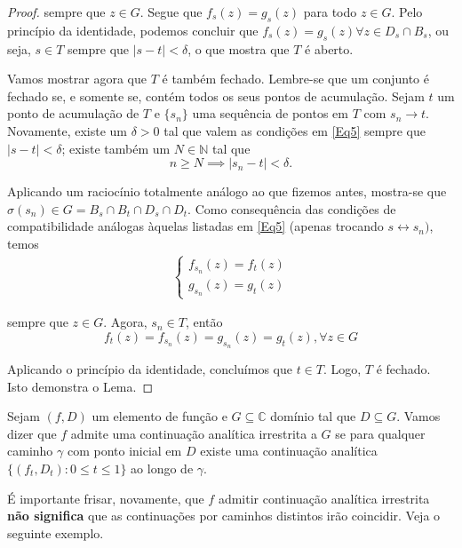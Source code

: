 \begin{proof}
sempre que $z \in G$. Segue que $f_s(z) = g_s(z)$ para todo $z \in G$. 
Pelo princípio da identidade, podemos concluir que 
$f_s(z) = g_s(z) \forall z \in D_s \cap B_s$, ou seja, $s \in T$ sempre que 
$|s-t|< \delta$, o que mostra que $T$ é aberto.

Vamos mostrar agora que $T$ é também fechado. Lembre-se que um conjunto é fechado 
se, e somente se, contém todos os seus pontos de acumulação. Sejam $t$ um ponto de
acumulação de $T$ e $\{s_n\}$ uma sequência de pontos em $T$ com $s_n \to t$. 
Novamente, existe um $\delta > 0$ tal que valem as condições em \ref{Eq5} sempre que
$|s-t|<\delta$; existe também um $N \in \mathbb{N}$ tal que 
\begin{equation*}
n \geq N \implies |s_n - t| < \delta.
\end{equation*}

Aplicando um raciocínio totalmente análogo ao que fizemos antes, mostra-se que
$\sigma(s_n) \in G = B_s \cap B_t \cap D_s \cap D_t$. Como consequência das 
condições de compatibilidade análogas àquelas listadas em \ref{Eq5} 
(apenas trocando $s \leftrightarrow s_n)$, temos
\begin{align*}
    \begin{cases}
    f_{s_n}(z) = f_t(z) \\
    g_{s_n}(z) = g_t(z)
    \end{cases}
\end{align*}

sempre que $z \in G$. Agora, $s_n \in T$, então 
\begin{equation*}
f_t(z) = f_{s_n}(z) = g_{s_n}(z) = g_t(z), \forall z\in G
\end{equation*}

Aplicando o princípio da identidade, concluímos que $t \in T$. Logo, $T$ é fechado. 
Isto demonstra o Lema.
\end{proof}

\begin{definicao}
\label{def-continuacao-irrestrita}
Sejam $(f,D)$ um elemento de função e $G\subseteq\mathbb{C}$ domínio tal que 
$D\subseteq G$. Vamos dizer que $f$ admite uma continuação analítica irrestrita a 
$G$ se para qualquer caminho $\gamma$ com ponto inicial em $D$ existe uma continuação
analítica $\{(f_t, D_t) : 0\leq t\leq 1\}$ ao longo de $\gamma$.
\end{definicao}

É importante frisar, novamente, que $f$ admitir continuação analítica irrestrita 
\textbf{não significa} que as continuações por caminhos distintos irão coincidir.
Veja o seguinte exemplo.

